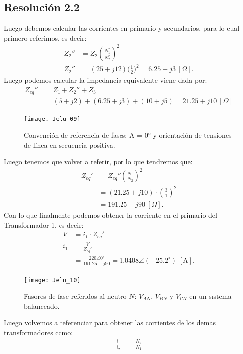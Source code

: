 \documentclass[
  11pt,
  letterpaper,
   addpoints,
  ]{exam}
\begin{document}
\begin{questions}
\begin{solution}
\subsection*{Resolución 2.2}
Luego debemos calcular las corrientes en primario y secundarios, para lo cual primero referimos, es decir:
\begin{align}
    Z_2''&= Z_2\left(\frac{N_1^*}{N_2^*}\right)^{\!2} \\
Z_2''&=(25+j12)\Big(\tfrac{1}{2}\Big)^2=6.25+j3~[\Omega].
\end{align}
Luego podemos calcular la impedancia equivalente viene dada por:
\begin{align}
    Z_{eq}'' &= Z_{1} + Z_2'' + Z_3 \\
    &= (5+j2) + (6.25+j3) + (10+j5) = 21.25 + j10~[\Omega]
\end{align}
\begin{figure}[H]
  \centering
  \texttt{[image: Jelu\_09]}
  \caption{Convención de referencia de fases: A = 0° y orientación de tensiones de línea en secuencia positiva.}
\end{figure}
Luego tenemos que volver a referir, por lo que tendremos que:
\begin{align}
    Z_{eq}' &= Z_{eq}'' \left(\frac{N_1}{N_2}\right)^2 \\
    &= (21.25 + j10) \cdot \left(\frac{3}{1}\right)^2\\
    &= 191.25 + j90~[\Omega].
\end{align}
Con lo que finalmente podemos obtener la corriente en el primario del Transformador 1, es decir:
\begin{align}
    V&= i_1 \cdot Z_{eq}' \\
    i_1 &= \frac{V}{Z_{eq}'}\\
    &= \frac{220\angle0^\circ}{191.25 + j90} = 1.0408\angle(-25.2^\circ)\;[\mathrm{A}].
\end{align}
\begin{figure}[H]
  \centering
  \texttt{[image: Jelu\_10]}
  \caption{Fasores de fase referidos al neutro $N$: $V_{AN}$, $V_{BN}$ y $V_{CN}$ en un sistema balanceado.}
\end{figure}
Luego volvemos a referenciar para obtener las corrientes de los demas transformadores como:
\begin{align}
    \frac{i_1}{i_2} &= \frac{N_2}{N_1} \\

\end{align}
\end{solution}
\end{questions}
\end{document}
